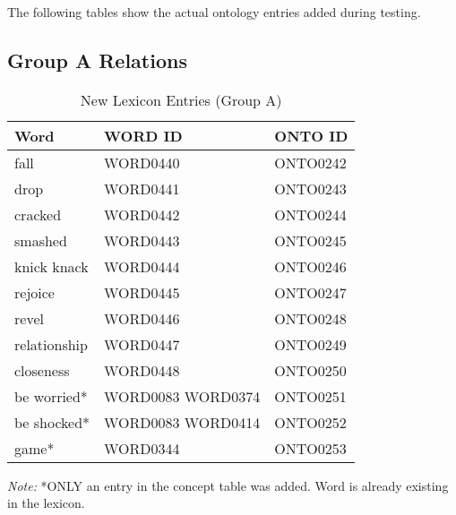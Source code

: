 %
%
%                 
\label{sec:appendixontology}

The following tables show the actual ontology entries added during testing. 

\subsection{Group A Relations}

\begin{table}[H]   %
\centering
\caption{New Lexicon Entries (Group A)} \vspace{0.25em}
\begin{tabular}{|l|l|l|} \hline
\textbf{Word} & \textbf{WORD ID} & \textbf{ONTO ID} \\ \hline
fall & WORD0440 & ONTO0242 \\ \hline
drop & WORD0441 & ONTO0243 \\ \hline
cracked & WORD0442 & ONTO0244 \\ \hline
smashed & WORD0443 & ONTO0245 \\ \hline
knick knack & WORD0444 & ONTO0246 \\ \hline
rejoice & WORD0445 & ONTO0247 \\ \hline
revel & WORD0446 & ONTO0248 \\ \hline
relationship & WORD0447 & ONTO0249 \\ \hline
closeness & WORD0448 & ONTO0250 \\ \hline
be worried* & WORD0083 WORD0374 & ONTO0251 \\ \hline
be shocked* & WORD0083 WORD0414 & ONTO0252 \\ \hline
game* & WORD0344 & ONTO0253 \\ \hline
\end{tabular}
\label{tab:grpalex}
\end{table}

\textit{Note:}
*ONLY an entry in the concept table was added. Word is already existing in the lexicon.

